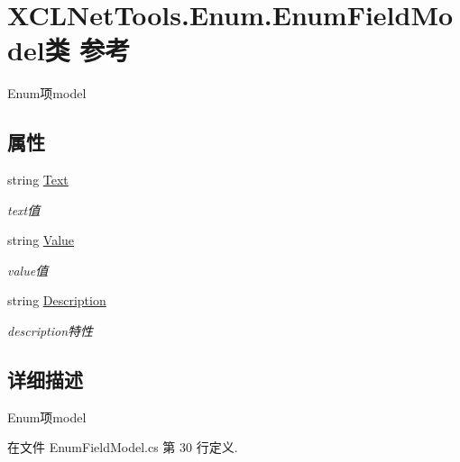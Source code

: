 \hypertarget{class_x_c_l_net_tools_1_1_enum_1_1_enum_field_model}{\section{X\-C\-L\-Net\-Tools.\-Enum.\-Enum\-Field\-Model类 参考}
\label{class_x_c_l_net_tools_1_1_enum_1_1_enum_field_model}
}


Enum项model  


\subsection*{属性}
\begin{DoxyCompactItemize}
\item 
string \hyperlink{class_x_c_l_net_tools_1_1_enum_1_1_enum_field_model_acbbc7df1972c0c70dfcf43413da878a8}{Text}
\begin{DoxyCompactList}\small\item\em text值 \end{DoxyCompactList}\item 
string \hyperlink{class_x_c_l_net_tools_1_1_enum_1_1_enum_field_model_a907462fed405f7065a6fc013cc919e29}{Value}
\begin{DoxyCompactList}\small\item\em value值 \end{DoxyCompactList}\item 
string \hyperlink{class_x_c_l_net_tools_1_1_enum_1_1_enum_field_model_a182875468bc25ee9c6adb98582e3683e}{Description}
\begin{DoxyCompactList}\small\item\em description特性 \end{DoxyCompactList}\end{DoxyCompactItemize}


\subsection{详细描述}
Enum项model 



在文件 Enum\-Field\-Model.\-cs 第 30 行定义.



